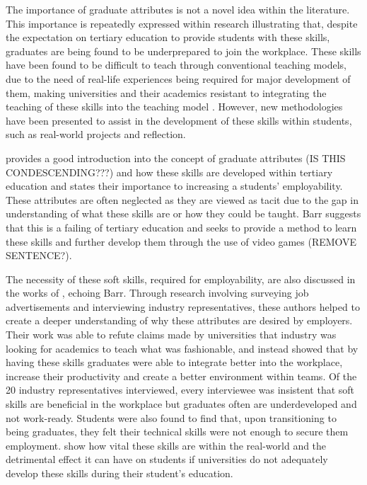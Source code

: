 \documentclass{l4proj}
\begin{document}
The importance of graduate attributes is not a novel idea within the literature. This importance is repeatedly expressed within research illustrating that, despite the expectation on tertiary education to provide students with these skills, graduates are being found to be underprepared to join the workplace. These skills have been found to be difficult to teach through conventional teaching models, due to the need of real-life experiences being required for major development of them, making universities and their academics resistant to integrating the teaching of these skills into the teaching model \citep{barr_2019}. However, new methodologies have been presented to assist in the development of these skills within students, such as real-world projects and reflection.
 
\citet{barr_2019} provides a good introduction into the concept of graduate attributes (IS THIS CONDESCENDING???) and how these skills are developed within tertiary education and states their importance to increasing a students’ employability. These attributes are often neglected as they are viewed as tacit due to the gap in understanding of what these skills are or how they could be taught. Barr suggests that this is a failing of tertiary education and seeks to provide a method to learn these skills and further develop them through the use of video games (REMOVE SENTENCE?). 

The necessity of these soft skills, required for employability, are also discussed in the works of \citet{stevens_industry_2016}, echoing Barr. Through research involving surveying job advertisements and interviewing industry representatives, these authors helped to create a deeper understanding of why these attributes are desired by employers. Their work was able to refute claims made by universities that industry was looking for academics to teach what was fashionable, and instead showed that by having these skills graduates were able to integrate better into the workplace, increase their productivity and create a better environment within teams. Of the 20 industry representatives interviewed, every interviewee was insistent that soft skills are beneficial in the workplace but graduates often are underdeveloped and not work-ready. Students were also found to find that, upon transitioning to being graduates, they felt their technical skills were not enough to secure them employment. \citet{stevens_industry_2016} show how vital these skills are within the real-world and the detrimental effect it can have on students if universities do not adequately develop these skills during their student's education.
\end{document}
